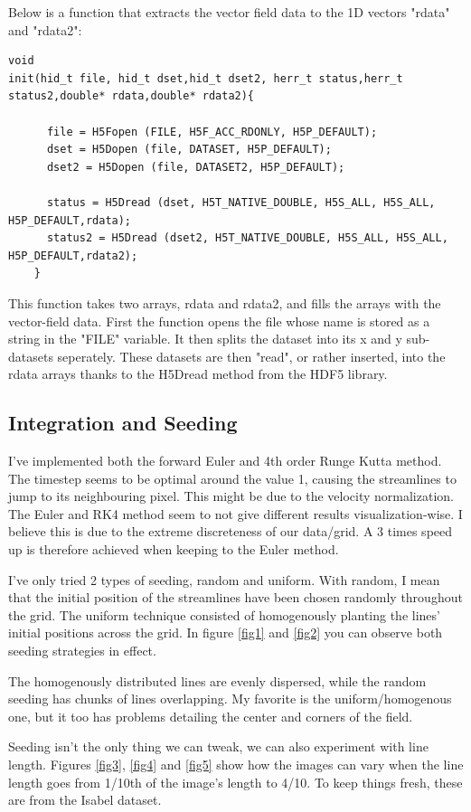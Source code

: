 \documentclass[a4paper,10pt]{report}
\begin{document}
Below is a function that extracts the vector field data to the 1D vectors "rdata" and "rdata2":
\begin{lstlisting}
void 
init(hid_t file, hid_t dset,hid_t dset2, herr_t status,herr_t status2,double* rdata,double* rdata2){

      file = H5Fopen (FILE, H5F_ACC_RDONLY, H5P_DEFAULT);
      dset = H5Dopen (file, DATASET, H5P_DEFAULT);
      dset2 = H5Dopen (file, DATASET2, H5P_DEFAULT);

      status = H5Dread (dset, H5T_NATIVE_DOUBLE, H5S_ALL, H5S_ALL, H5P_DEFAULT,rdata);
      status2 = H5Dread (dset2, H5T_NATIVE_DOUBLE, H5S_ALL, H5S_ALL, H5P_DEFAULT,rdata2);
    }
\end{lstlisting}
This function takes two arrays, rdata and rdata2, and fills the arrays with the vector-field data. 
First the function opens the file whose name is stored as a string in the "FILE" variable.
It then splits the dataset into its x and y sub-datasets seperately. These datasets are then "read", or rather inserted, into the rdata arrays thanks to the H5Dread method from the HDF5 library.
\subsection*{Integration and Seeding}

I've implemented both the forward Euler and 4th order Runge Kutta method. The timestep seems to be optimal around the value 1, causing the streamlines to jump to its neighbouring pixel. This might be due to the velocity normalization.
The Euler and RK4 method seem to not give different results visualization-wise. I believe this is due to the extreme discreteness of our data/grid. A 3 times speed up is therefore achieved when keeping to the Euler method.

I've only tried 2 types of seeding, random and uniform. With random, I mean that the initial position of the streamlines have been chosen randomly throughout the grid. The uniform technique consisted of homogenously planting 
the lines' initial positions across the grid. In figure \ref{fig1} and \ref{fig2} you can observe both seeding strategies in effect. 

The homogenously distributed lines are evenly dispersed, while the random seeding has chunks of lines overlapping.
My favorite is the uniform/homogenous one, but it too has problems detailing the center and corners of the field.

Seeding isn't the only thing we can tweak, we can also experiment with line length. Figures \ref{fig3}, \ref{fig4} and \ref{fig5} show how the images can vary when the line length goes from 1/10th of the image's length to 4/10. To keep things fresh, these are from the Isabel dataset.
\end{document}
